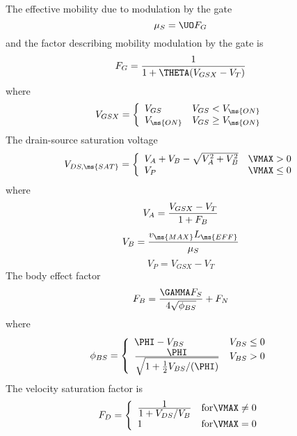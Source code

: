 The effective mobility due to modulation by the gate
\begin{equation}
\mu_S = \UO F_G
\end{equation}
and the factor describing mobility modulation by the gate is
\begin{equation}
    F_G = {1 \over {1 + \THETA (V_{GSX}-V_T)}}
\end{equation}
where
\begin{equation}
V_{GSX} = \left\{ \begin{array}{ll}
          V_{GS}      &  V_{GS} < V_{\ms{ON}}\\
          V_{\ms{ON}} &  V_{GS} \ge V_{\ms{ON}}
          \end{array} \right. %
\label{eqn:vgsx:l3}
\end{equation}
The drain-source saturation voltage
\begin{equation}
V_{DS,\ms{SAT}} = \left\{ \begin{array}{ll}
           V_A + V_B - \sqrt{V_A^2 + V_B^2} & \VMAX > 0\\
           V_P                  & \VMAX \le 0
           \end{array} \right. %
\end{equation}
where
\begin{equation}
V_A = {{V_{GSX} - V_T} \over {1+F_B}}
\end{equation}
\begin{equation}
V_B = {{v_{\ms{MAX}}L_{\ms{EFF}}}\over{\mu_S}}
\end{equation}
\begin{equation}
V_P = V_{GSX} - V_T
\end{equation}
The body effect factor
\begin{equation}
F_B = {{\GAMMA F_S} \over {4 \sqrt{\phi_{BS}}}} + F_N
\label{eqn:fb:l3}
\end{equation}
where
\begin{equation}
\phi_{BS} = \left\{ \begin{array}{ll}
            \PHI - V_{BS}    &  V_{BS} \le 0\\
            {{\textstyle \PHI}\over{\textstyle\sqrt{1+\frac{1}{2}V_{BS}/
                 (\PHI)}}}    & V_{BS} > 0
           \end{array} \right. %
\end{equation}
The velocity saturation factor is
\begin{equation}
    F_D = \left\{ \begin{array}{ll}
          {{\textstyle 1} \over {\textstyle 1 + V_{DS}/V_B}}
                      & \mbox{for} \VMAX \ne 0 \\
           1                              & \mbox{for} \VMAX = 0
       \end{array} \right. %
\end{equation}

